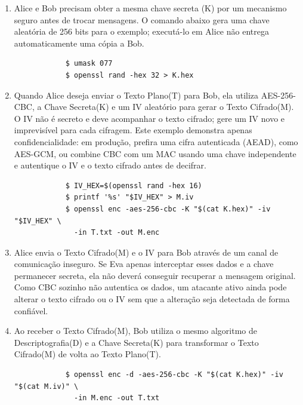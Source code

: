 \documentclass{article}
\begin{document}
\begin{enumerate}
	\item Alice e Bob precisam obter a mesma chave secreta (K) por um mecanismo seguro antes de trocar mensagens. O comando abaixo gera uma chave aleatória de 256 bits para o exemplo; executá-lo em Alice não entrega automaticamente uma cópia a Bob.
	\begin{tcolorbox}[width=\textwidth]
		{\normalsize
			\begin{verbatim}
			$ umask 077
			$ openssl rand -hex 32 > K.hex
			\end{verbatim}
		}
	\end{tcolorbox}
	\item Quando Alice deseja enviar o Texto Plano(T) para Bob, ela utiliza AES-256-CBC, a Chave Secreta(K) e um IV aleatório para gerar o Texto Cifrado(M). O IV não é secreto e deve acompanhar o texto cifrado; gere um IV novo e imprevisível para cada cifragem. Este exemplo demonstra apenas confidencialidade: em produção, prefira uma cifra autenticada (AEAD), como AES-GCM, ou combine CBC com um MAC usando uma chave independente e autentique o IV e o texto cifrado antes de decifrar.
	\begin{tcolorbox}[width=\textwidth]
		{\normalsize
			\begin{verbatim}
			$ IV_HEX=$(openssl rand -hex 16)
			$ printf '%s' "$IV_HEX" > M.iv
			$ openssl enc -aes-256-cbc -K "$(cat K.hex)" -iv "$IV_HEX" \
			  -in T.txt -out M.enc
			\end{verbatim}
		}
	\end{tcolorbox}
	\item Alice envia o Texto Cifrado(M) e o IV para Bob através de um canal de comunicação inseguro. Se Eva apenas interceptar esses dados e a chave permanecer secreta, ela não deverá conseguir recuperar a mensagem original. Como CBC sozinho não autentica os dados, um atacante ativo ainda pode alterar o texto cifrado ou o IV sem que a alteração seja detectada de forma confiável.
	\item Ao receber o Texto Cifrado(M), Bob utiliza o mesmo algoritmo de Descriptografia(D) e a Chave Secreta(K) para transformar o Texto Cifrado(M) de volta ao Texto Plano(T).
	\begin{tcolorbox}[width=\textwidth]
		{\normalsize
			\begin{verbatim}
			$ openssl enc -d -aes-256-cbc -K "$(cat K.hex)" -iv "$(cat M.iv)" \
			  -in M.enc -out T.txt
			\end{verbatim}
		}
	\end{tcolorbox}
\end{enumerate}
\end{document}
